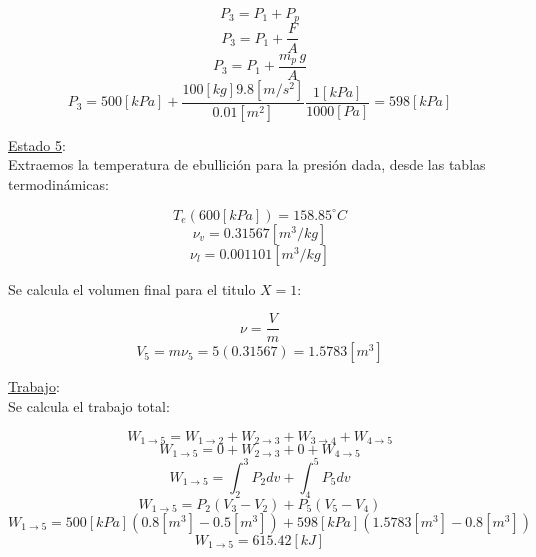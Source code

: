 \documentclass[letter,11pt]{article}
\begin{document}
\begin{enumerate}
\begin{equation*}
    P_3=P_1+P_p
\end{equation*}
\begin{equation*}
    P_3=P_1+\frac{F}{A}
\end{equation*}
\begin{equation*}
    P_3=P_1+\frac{m_p\,g}{A}
\end{equation*}
\begin{equation*}
    P_3=500[kPa]+\frac{100[kg]9.8[m/s^2]}{0.01[m^2]}\frac{1[kPa]}{1000[Pa]}
    =598[kPa]
\end{equation*}

\underline{Estado 5}:\\
Extraemos la temperatura de ebullición para la presión dada, desde las tablas
termodinámicas:

\begin{equation*}
    T_{e}(600[kPa])=158.85^\circ C
\end{equation*}
\begin{equation*}
    \nu_v=0.31567[m^3/kg]
\end{equation*}
\begin{equation*}
    \nu_l=0.001101[m^3/kg]
\end{equation*}

Se calcula el volumen final para el titulo $X=1$:

\begin{equation*}
    \nu=\frac{V}{m}
\end{equation*}
\begin{equation*}
    V_5=m\nu_5=5(0.31567)=1.5783[m^3]
\end{equation*}

\underline{Trabajo}:\\
Se calcula el trabajo total:

\begin{equation*}
    W_{1\rightarrow 5}=W_{1\rightarrow 2}+W_{2\rightarrow 3}+
    W_{3\rightarrow 4}+W_{4\rightarrow 5}
\end{equation*}
\begin{equation*}
    W_{1\rightarrow 5}=0+W_{2\rightarrow 3}+0+W_{4\rightarrow 5}
\end{equation*}
\begin{equation*}
    W_{1\rightarrow 5}=\int_2^3 P_2 dv+\int_4^5 P_5 dv
\end{equation*}
\begin{equation*}
    W_{1\rightarrow 5}=P_2(V_3-V_2)+P_5(V_5-V_4)
\end{equation*}
\begin{equation*}
    W_{1\rightarrow 5}=500[kPa](0.8[m^3]-0.5[m^3])+598[kPa](1.5783[m^3]-0.8[m^3])
\end{equation*}
\begin{equation*}
    W_{1\rightarrow 5}=615.42[kJ]
\end{equation*}


\end{enumerate}
\end{document}
